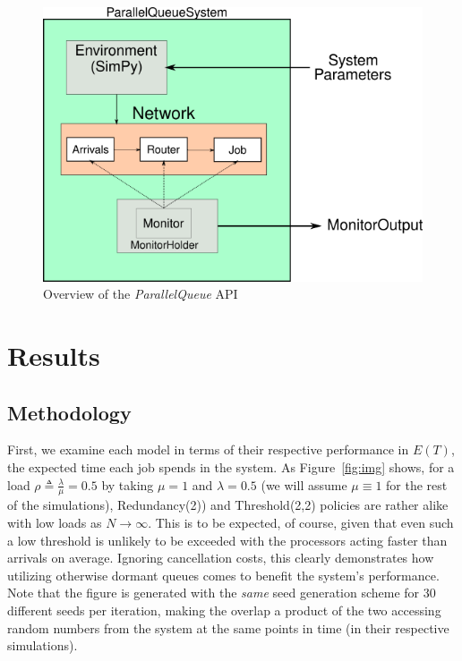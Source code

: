 \begin{figure}
    \centering
    \includegraphics[scale=0.7]{pq}
    \caption{Overview of the \textit{ParallelQueue} API}
    \label{fig:API}
\end{figure}


\section{Results}\label{sec:results}

\subsection{Methodology}\label{subsec:methodology}
First, we examine each model in terms of their respective performance in $E(T)$, the expected time each job spends in the system.
As Figure~\ref{fig:img} shows, for a load $\rho \triangleq \frac{\lambda}{\mu} = 0.5$ by taking $\mu=1$ and $\lambda = 0.5$ (we will assume $\mu \equiv 1$ for the
rest of the simulations), Redundancy(2)) and Threshold(2,2) policies are rather alike with low loads as $N \rightarrow \infty$. This is to be expected, of course, given that even such a low threshold is unlikely to be exceeded with the processors acting faster than arrivals on average. Ignoring cancellation costs, this clearly demonstrates how utilizing otherwise dormant queues comes to benefit the system's performance. Note that the figure is generated with the \textit{same} seed generation scheme for 30 different seeds per iteration, making the overlap a product of the two accessing random numbers from the system at the same points in time (in their respective simulations).

